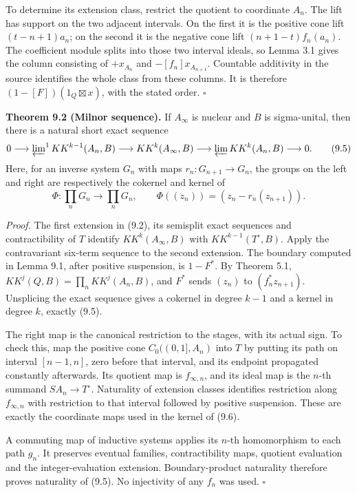 \documentclass[
  11pt,
]{article}
\begin{document}
To determine its extension class, restrict the quotient to coordinate
\(A_n\). The lift has support on the two adjacent intervals. On the
first it is the positive cone lift \((t-n+1)a_n\); on the second it is
the negative cone lift \((n+1-t)f_n(a_n)\). The coefficient module
splits into those two interval ideals, so Lemma 3.1 gives the column
consisting of \(+x_{A_n}\) and \(-[f_n]x_{A_{n+1}}\). Countable
additivity in the source identifies the whole class from these columns.
It is therefore \((1-[F])(1_Q\boxtimes x)\), with the stated order.
\(\square\)

\textbf{Theorem 9.2 (Milnor sequence).} If \(A_\infty\) is nuclear and
\(B\) is sigma-unital, then there is a natural short exact sequence \[
0\longrightarrow\varprojlim\nolimits^1 KK^{k-1}(A_n,B)
\longrightarrow KK^k(A_\infty,B)
\longrightarrow\varprojlim KK^k(A_n,B)
\longrightarrow0.
\tag{9.5}
\] Here, for an inverse system \(G_n\) with maps \(r_n:G_{n+1}\to G_n\),
the groups on the left and right are respectively the cokernel and
kernel of \[
\Phi:\prod_nG_n\longrightarrow\prod_nG_n,\qquad
\Phi((z_n))=(z_n-r_n(z_{n+1})).
\tag{9.6}
\]

\emph{Proof.} The first extension in (9.2), its semisplit exact
sequences and contractibility of \(T\) identify \(KK^k(A_\infty,B)\)
with \(KK^{k-1}(T^\circ,B)\). Apply the contravariant six-term sequence
to the second extension. The boundary computed in Lemma 9.1, after
positive suspension, is \(1-F^*\). By Theorem 5.1,
\(KK^j(Q,B)=\prod_nKK^j(A_n,B)\), and \(F^*\) sends \((z_n)\) to
\((f_n^*z_{n+1})\). Unsplicing the exact sequence gives a cokernel in
degree \(k-1\) and a kernel in degree \(k\), exactly (9.5).

The right map is the canonical restriction to the stages, with its
actual sign. To check this, map the positive cone \(C_0((0,1],A_n)\)
into \(T\) by putting its path on interval \([n-1,n]\), zero before that
interval, and its endpoint propagated constantly afterwards. Its
quotient map is \(f_{\infty,n}\), and its ideal map is the \(n\)-th
summand \(SA_n\to T^\circ\). Naturality of extension classes identifies
restriction along \(f_{\infty,n}\) with restriction to that interval
followed by positive suspension. These are exactly the coordinate maps
used in the kernel of (9.6).

A commuting map of inductive systems applies its \(n\)-th homomorphism
to each path \(g_n\). It preserves eventual families, contractibility
maps, quotient evaluation and the integer-evaluation extension.
Boundary-product naturality therefore proves naturality of (9.5). No
injectivity of any \(f_n\) was used. \(\square\)
\end{document}
